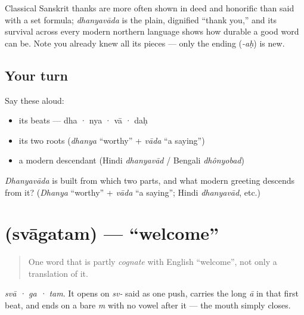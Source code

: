 \begin{culture}
Classical Sanskrit thanks are more often shown in deed and honorific than said with a set formula; \emph{dhanyavāda} is the plain, dignified \textquotedblleft{}thank you,\textquotedblright{} and its survival across every modern northern language shows how durable a good word can be. Note you already knew all its pieces — only the ending (\emph{-aḥ}) is new.
\end{culture}

\subsection*{Your turn}
Say these aloud:

\begin{itemize}
\raggedright
  \item its beats — dha · nya · vā · daḥ
  \item its two roots (\emph{dhanya} \textquotedblleft{}worthy\textquotedblright{} + \emph{vāda} \textquotedblleft{}a saying\textquotedblright{})
  \item a modern descendant (Hindi \emph{dhanyavād} / Bengali \emph{dhônyobad})
\end{itemize}

\begin{tcolorbox}[breakable,colback=teal!4,colframe=teal!35!black,title={Before you move on}]
\emph{Dhanyavāda} is built from which two parts, and what modern greeting descends from it? (\emph{Dhanya} \textquotedblleft{}worthy\textquotedblright{} + \emph{vāda} \textquotedblleft{}a saying\textquotedblright{}; Hindi \emph{dhanyavād}, etc.)
\end{tcolorbox}
\section[\texorpdfstring{\sk{स्वागतम्} (svāgatam)}{स्वागतम् (svāgatam)}]{ (svāgatam) — \textquotedblleft{}welcome\textquotedblright{}}

\label{lesson:SA-C01-svagatam}



\begin{quote}
One word that is partly \emph{cognate} with English \textquotedblleft{}welcome\textquotedblright{}, not only a translation of it.
\end{quote}

\begin{sounds}
\emph{svā · ga · tam}. It opens on \emph{sv-} said as one push, carries the long \emph{ā} in that first beat, and ends on a bare \emph{m} with no vowel after it — the mouth simply closes.
\end{sounds}

